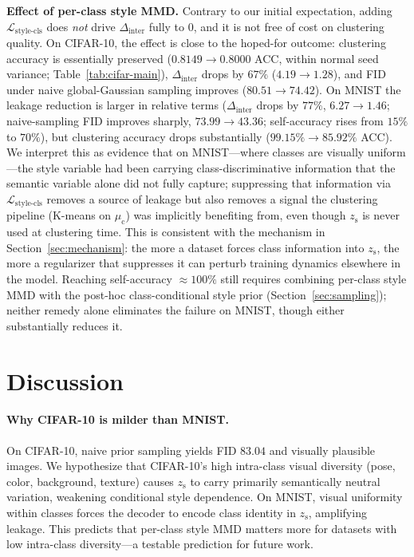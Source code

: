 \documentclass[10pt]{article}
\newcommand{\zs}{z_{\mathrm{s}}}
\newcommand{\muc}{\mu_{\mathrm{c}}}
\begin{document}
\textbf{Effect of per-class style MMD.}
Contrary to our initial expectation, adding $\mathcal{L}_{\mathrm{style\text{-}cls}}$
does \emph{not} drive $\Delta_{\mathrm{inter}}$ fully to $0$, and it is not free of
cost on clustering quality.
On CIFAR-10, the effect is close to the hoped-for outcome: clustering accuracy is
essentially preserved ($0.8149\to0.8000$ ACC, within normal seed variance;
Table~\ref{tab:cifar-main}), $\Delta_{\mathrm{inter}}$ drops by $67\%$
($4.19\to1.28$), and FID under naive global-Gaussian sampling improves
($80.51\to74.42$).
On MNIST the leakage reduction is larger in relative terms
($\Delta_{\mathrm{inter}}$ drops by $77\%$, $6.27\to1.46$; naive-sampling FID improves
sharply, $73.99\to43.36$; self-accuracy rises from $15\%$ to $70\%$), but clustering
accuracy drops substantially ($99.15\%\to85.92\%$ ACC).
We interpret this as evidence that on MNIST---where classes are visually
uniform---the style variable had been carrying class-discriminative information
that the semantic variable alone did not fully capture; suppressing that
information via $\mathcal{L}_{\mathrm{style\text{-}cls}}$ removes a source of
leakage but also removes a signal the clustering pipeline (K-means on $\muc$) was
implicitly benefiting from, even though $\zs$ is never used at clustering time.
This is consistent with the mechanism in Section~\ref{sec:mechanism}: the more a
dataset forces class information into $\zs$, the more a regularizer that
suppresses it can perturb training dynamics elsewhere in the model.
Reaching self-accuracy $\approx 100\%$ still requires combining per-class style MMD
with the post-hoc class-conditional style prior (Section~\ref{sec:sampling}); neither
remedy alone eliminates the failure on MNIST, though either substantially reduces it.

\section{Discussion}

\paragraph{Why CIFAR-10 is milder than MNIST.}
On CIFAR-10, naive prior sampling yields FID $83.04$ and visually plausible images.
We hypothesize that CIFAR-10's high intra-class visual diversity (pose, color,
background, texture) causes $\zs$ to carry primarily semantically neutral variation,
weakening conditional style dependence.
On MNIST, visual uniformity within classes forces the decoder to encode class identity
in $\zs$, amplifying leakage.
This predicts that per-class style MMD matters more for datasets with low intra-class
diversity---a testable prediction for future work.
\end{document}
